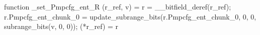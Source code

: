 function _set_Pmpcfg_ent_R (r_ref, v) = {
    r = __bitfield_deref(r_ref);
    r.Pmpcfg_ent_chunk_0 = update_subrange_bits(r.Pmpcfg_ent_chunk_0, 0, 0, subrange_bits(v, 0, 0));
    (*r_ref) = r
}
